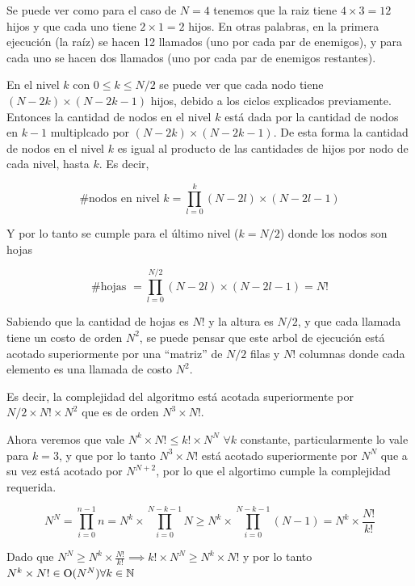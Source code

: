     Se puede ver como para el caso de $N = 4$ tenemos que la raiz tiene $4 \times 3 = 12$ hijos y que cada uno tiene $2 \times 1 = 2$ hijos. En otras palabras, en la primera ejecución (la raíz) se hacen 12 llamados (uno por cada par de enemigos), y para cada uno se hacen dos llamados (uno por cada par de enemigos restantes).

    En el nivel $k$ con $0 \leq k \leq N / 2$ se puede ver que cada nodo tiene $(N - 2k) \times (N - 2k - 1)$ hijos,
    debido a los ciclos explicados previamente. Entonces la cantidad de nodos en el nivel $k$ está dada por la cantidad de nodos en $k - 1$ multiplcado por $(N - 2k) \times (N - 2k -1)$. De esta forma la cantidad de nodos en el nivel $k$ es igual al producto de las cantidades de hijos por nodo de cada nivel, hasta $k$. Es decir, 

    \[\text{\#nodos en nivel }k = \prod_{l = 0}^{k}(N - 2l) \times (N - 2l -1)\]

    Y por lo tanto se cumple para el último nivel ($k = N/2$) donde los nodos son hojas

    \[\text{\#hojas }= \prod_{l = 0}^{N / 2}(N - 2l) \times (N - 2l -1) = N!\]

    Sabiendo que la cantidad de hojas es $N!$ y la altura es $N/2$, y que cada llamada tiene un costo de orden $N^2$, se puede pensar que este arbol de ejecución está acotado superiormente por una ``matriz'' de $N/2$ filas y $N!$ columnas donde cada elemento es una llamada de costo $N^2$.

    Es decir, la complejidad del algoritmo está acotada superiormente por $N/2 \times N! \times N^2$ que es de orden $N^3 \times N!$.

    Ahora veremos que vale $N^k \times N! \leq k! \times N^N$ $\forall k$ constante, particularmente lo vale para $k = 3$, y que por lo tanto $N^3 \times N!$ está acotado superiormente por $N^N$ que a su vez está acotado por $N^{N + 2}$, por lo que el algortimo cumple la complejidad requerida.

    \[ N^N = \prod_{i = 0}^{n - 1}n = N^k \times \prod_{i = 0}^{N - k - 1} N \geq N^k \times \prod_{i = 0}^{N - k - 1} (N - 1) = N^k \times \frac{N!}{k!}\]

    Dado que $N^N \geq N^k \times \frac{N!}{k!} \implies k! \times N^N \geq N^k \times N!$ y por lo tanto $N^k \times N! \in \operatorname{O}(N^N) \forall k \in \mathbb{N}$


